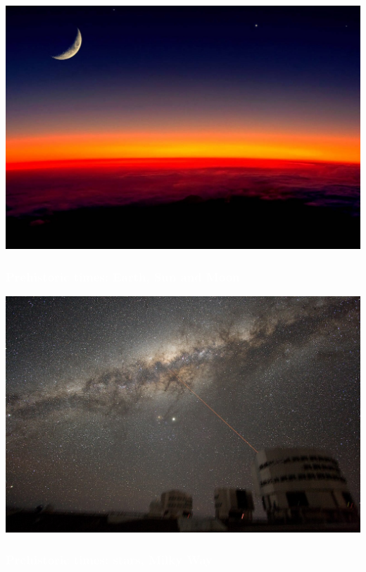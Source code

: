 \documentclass[aspectratio=169,xcolor=pdftex,dvipsnames]{beamer} %
\begin{document}
{
{
    \includegraphics[width=\paperwidth]{sunAndMoon.jpg}
}
\begin{frame}
\frametitle{\textcolor{white}{\hspace{7cm}Prehistoric times: Earth, Sun and Moon}}
 
\end{frame}
}


{
{
    \includegraphics[width=\paperwidth]{milkyWay.jpg}
}
\begin{frame}
\frametitle{\textcolor{white}{Prehistoric times: stars, Milky Way}}
 
\end{frame}
}
\end{document}
